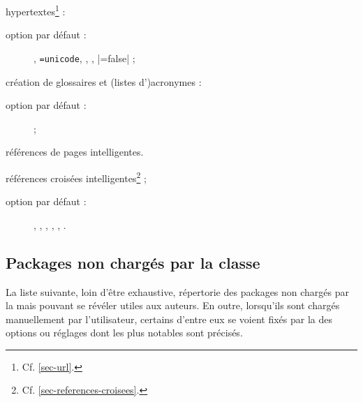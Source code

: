 \documentclass[french,nolocaltoc]{nwejmart}
\newtheorem[style=definition]{fait}
\newtheorem[title=expérience]{experience}
\newtheorem[title-plural=anneaux]{anneau}
\newtheorem[title=idéal,title-plural=idéaux]{ideal}
\begin{document}
\begin{description}
  hypertextes\footnote{Cf. \vref{sec-url}.} :
  \begin{description}
  \item[option par défaut :] ,
    \lstinline[alsolanguage={[hyperref]TeX}]|=unicode|,
    , ,
    |=false| ;
  \end{description}
\item[\package{glossaries} :] création de glossaires et (listes d')acronymes :
  \begin{description}
  \item[option par défaut :]  ;
  \end{description}
\item[\package{varioref} :] références de pages intelligentes.
\item[\package{cleveref} :] références croisées
  intelligentes\footnote{Cf. \vref{sec-references-croisees}.} ;
  \begin{description}
  \item[option par défaut :] , ,
    , , ,
    .
  \end{description}
\end{description}

\subsection{Packages non  chargés par la classe}\label{sec:packages-non-charges}

La liste suivante, loin d'être exhaustive, répertorie des packages non chargés
par la \nwejmauthorcl{} mais pouvant se révéler utiles aux auteurs.  En outre,
lorsqu'ils sont chargés manuellement par l'utilisateur, certains d'entre eux se
voient fixés par la \nwejmauthorcl{} des options ou réglages dont les plus
notables sont précisés.
\end{document}
